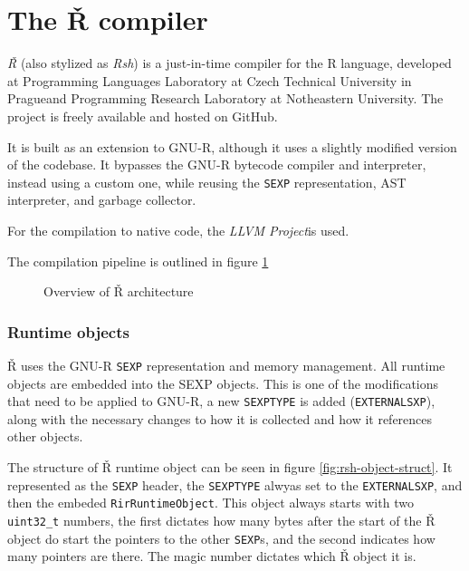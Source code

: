 \newpage
\section{The Ř compiler}

\textit{Ř} (also stylized as \textit{Rsh}) is a just-in-time compiler for the R language, developed at Programming Languages Laboratory at Czech Technical University in Prague\todocite and Programming Research Laboratory at Notheastern University\todocite. The project is freely available and hosted on GitHub.

It is built as an extension to GNU-R, although it uses a slightly modified version of the codebase. It bypasses the GNU-R bytecode compiler and interpreter, instead using a custom one, while reusing the \texttt{SEXP} representation, AST interpreter, and garbage collector.

For the compilation to native code, the \textit{LLVM Project}\todocite is used.

The compilation pipeline is outlined in figure \ref{fig:rsh-archit}

\begin{figure}
	\centering
	\caption{Overview of Ř architecture}\label{fig:rsh-archit}
\end{figure}

\subsubsection*{Runtime objects}


Ř uses the GNU-R \texttt{SEXP} representation and memory management. All runtime objects are embedded into the SEXP objects. This is one of the modifications that need to be applied to GNU-R, a new \texttt{SEXPTYPE} is added (\texttt{EXTERNALSXP}), along with the necessary changes to how it is collected and how it references other objects.

The structure of Ř runtime object can be seen in figure \ref{fig:rsh-object-struct}. It represented as the \texttt{SEXP} header, the \texttt{SEXPTYPE} alwyas set to the \texttt{EXTERNALSXP}, and then the embeded \texttt{RirRuntimeObject}. This object always starts with two \texttt{uint32\_t} numbers, the first dictates how many bytes after the start of the Ř object do start the pointers to the other \texttt{SEXP}s, and the second indicates how many pointers are there. The magic number dictates which Ř object it is.

